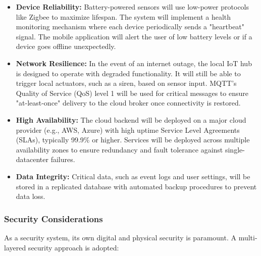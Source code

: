 \documentclass[conference]{IEEEtran}
\begin{document}
\begin{itemize}
    \item \textbf{Device Reliability:} Battery-powered sensors will use low-power protocols like Zigbee to maximize lifespan. The system will implement a health monitoring mechanism where each device periodically sends a "heartbeat" signal. The mobile application will alert the user of low battery levels or if a device goes offline unexpectedly.
    
    \item \textbf{Network Resilience:} In the event of an internet outage, the local IoT hub is designed to operate with degraded functionality. It will still be able to trigger local actuators, such as a siren, based on sensor input. MQTT's Quality of Service (QoS) level 1 will be used for critical messages to ensure "at-least-once" delivery to the cloud broker once connectivity is restored.
    
    \item \textbf{High Availability:} The cloud backend will be deployed on a major cloud provider (e.g., AWS, Azure) with high uptime Service Level Agreements (SLAs), typically 99.9\% or higher. Services will be deployed across multiple availability zones to ensure redundancy and fault tolerance against single-datacenter failures.
    
    \item \textbf{Data Integrity:} Critical data, such as event logs and user settings, will be stored in a replicated database with automated backup procedures to prevent data loss.
\end{itemize}

\subsubsection{Security Considerations}
As a security system, its own digital and physical security is paramount. A multi-layered security approach is adopted:
\end{document}
